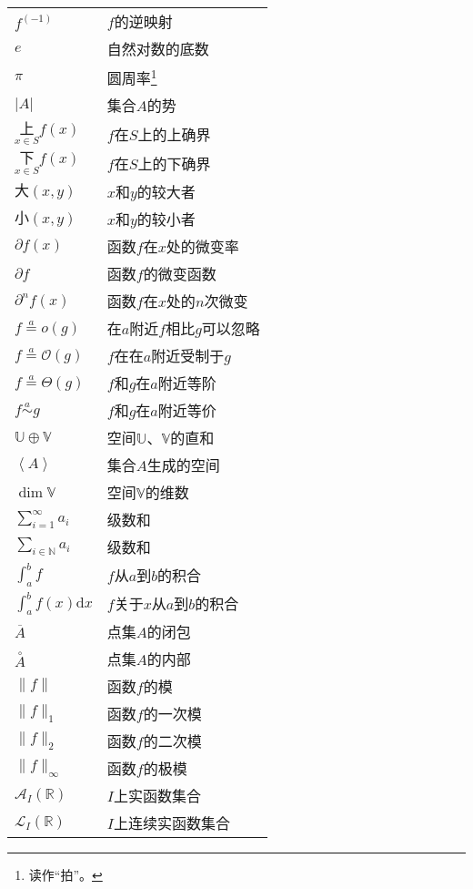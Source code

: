 \documentclass[12pt,UTF8]{article}
\newcommand{\oveq}[1]{\overset{#1}{=}}
\newcommand{\olim}[1]{\mathit{o}\left(#1\right)}  %
\newcommand{\Olim}[1]{\mathcal{O}\left(#1\right)}  %
\newcommand{\Tlim}[1]{\mathcal{\Theta}\left(#1\right)}  %
\newcommand{\eqlim}[1]{\overset{#1}{\sim}}  %
\newcommand{\vect}[1]{\left\langle #1 \right\rangle}
\begin{document}
\begin{longtable}{ m{15em} m{15em} }
    $f^{(-1)}$ & $f$的逆映射 \\
    $e$ & 自然对数的底数 \\
    $\pi$ & 圆周率\footnote{读作“拍”。} \\
    $|A|$ & 集合$A$的势 \\
    $\underset{x\in S}{\text{上}} f(x)$ & $f$在$S$上的上确界\\
    $\underset{x\in S}{\text{下}} f(x)$ & $f$在$S$上的下确界\\
    $\text{大}(x, y)$ & $x$和$y$的较大者 \\
    $\text{小}(x, y)$ & $x$和$y$的较小者 \\
    $\partial f(x)$ & 函数$f$在$x$处的微变率 \\
    $\partial f$ & 函数$f$的微变函数 \\
    $\partial^n f(x)$ & 函数$f$在$x$处的$n$次微变 \\
    $ f \oveq{a} \olim{g}$ & 在$a$附近$f$相比$g$可以忽略 \\
    $ f \oveq{a} \Olim{g}$ & $f$在在$a$附近受制于$g$ \\
    $ f \oveq{a} \Tlim{g}$ & $f$和$g$在$a$附近等阶 \\
    $ f \eqlim{a} g$ & $f$和$g$在$a$附近等价 \\
    $\mathbb{U} \oplus \mathbb{V}$ & 空间$\mathbb{U}$、$\mathbb{V}$的直和 \\
    $\vect{A}$ & 集合$A$生成的空间 \\
    $\dim{\mathbb{V}}$ & 空间$\mathbb{V}$的维数 \\
    $\displaystyle\sum_{i=1}^\infty a_i$ & 级数和 \\
    $\displaystyle\sum_{i\in\mathbb{N}} a_i$ & 级数和 \\
    $\displaystyle\int_{a}^b f$ & $f$从$a$到$b$的积合 \\
    $\displaystyle\int_{a}^b f(x)\mathrm{d}x$ & $f$关于$x$从$a$到$b$的积合 \\
    $\overline{A}$ & 点集$A$的闭包 \\
    $\overset{\circ}{A}$ & 点集$A$的内部 \\
    $\|f\|$ & 函数$f$的模 \\
    $\|f\|_{1}$ & 函数$f$的一次模 \\
    $\|f\|_{2}$ & 函数$f$的二次模 \\
    $\|f\|_{\infty}$ & 函数$f$的极模 \\
    $\mathcal{A}_I(\mathbb{R})$ & $I$上实函数集合 \\
    $\mathcal{L}_I(\mathbb{R})$ & $I$上连续实函数集合 \\

\end{longtable}
\end{document}
